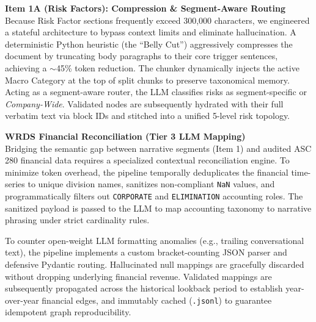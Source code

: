 \vspace{0.5em}
\noindent\textbf{Item 1A (Risk Factors): Compression \& Segment-Aware Routing} \\
Because Risk Factor sections frequently exceed 300,000 characters, we engineered a stateful architecture to bypass context limits and eliminate hallucination. A deterministic Python heuristic (the ``Belly Cut'') aggressively compresses the document by truncating body paragraphs to their core trigger sentences, achieving a $\sim$45\% token reduction. The chunker dynamically injects the active Macro Category at the top of split chunks to preserve taxonomical memory. Acting as a segment-aware router, the LLM classifies risks as segment-specific or \textit{Company-Wide}. Validated nodes are subsequently hydrated with their full verbatim text via block IDs and stitched into a unified 5-level risk topology.

\vspace{0.5em}
\noindent\textbf{WRDS Financial Reconciliation (Tier 3 LLM Mapping)} \\
Bridging the semantic gap between narrative segments (Item 1) and audited ASC 280 financial data requires a specialized contextual reconciliation engine. To minimize token overhead, the pipeline temporally deduplicates the financial time-series to unique division names, sanitizes non-compliant \texttt{NaN} values, and programmatically filters out \texttt{CORPORATE} and \texttt{ELIMINATION} accounting roles. The sanitized payload is passed to the LLM to map accounting taxonomy to narrative phrasing under strict cardinality rules. 

To counter open-weight LLM formatting anomalies (e.g., trailing conversational text), the pipeline implements a custom bracket-counting JSON parser and defensive Pydantic routing. Hallucinated null mappings are gracefully discarded without dropping underlying financial revenue. Validated mappings are subsequently propagated across the historical lookback period to establish year-over-year financial edges, and immutably cached (\texttt{.jsonl}) to guarantee idempotent graph reproducibility.

